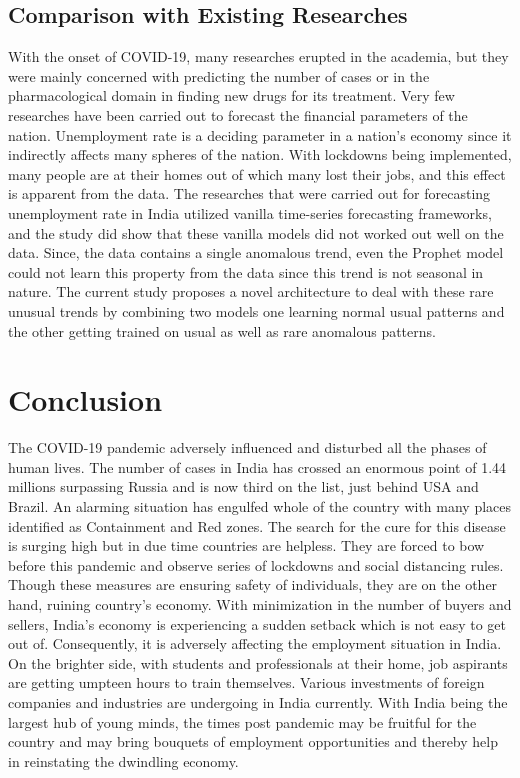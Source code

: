 \documentclass[times,twocolumn,final,authoryear]{elsarticle}
\begin{document}
	\subsection{Comparison with Existing Researches}
	With the onset of COVID-19, many researches erupted in the academia, but they were mainly concerned with predicting the number of cases or in the pharmacological domain in finding new drugs for its treatment. Very few researches have been carried out to forecast the financial parameters of the nation. Unemployment rate is a deciding parameter in a nation's economy since it indirectly affects many spheres of the nation. With lockdowns being implemented, many people are at their homes out of which many lost their jobs, and this effect is apparent from the data. The researches that were carried out for forecasting unemployment rate in India utilized vanilla time-series forecasting frameworks, and the study did show that these vanilla models did not worked out well on the data. Since, the data contains a single anomalous trend, even the Prophet model could not learn this property from the data since this trend is not seasonal in nature. The current study proposes a novel architecture to deal with these rare unusual trends by combining two models one learning normal usual patterns and the other getting trained on usual as well as rare anomalous patterns. 
	
	
	\section{Conclusion}\label{Sec_Final}
	The COVID-19 pandemic adversely influenced and disturbed all the phases of human lives. The number of cases in India has crossed an enormous point of 1.44 millions surpassing Russia and is now third on the list, just behind USA and Brazil. An alarming situation has engulfed whole of the country with many places identified as Containment and Red zones. The search for the cure for this disease is surging high but in due time countries are helpless. They are forced to bow before this pandemic and observe series of lockdowns and social distancing rules. Though these measures are ensuring safety of individuals, they are on the other hand, ruining country's economy. With minimization in the number of buyers and sellers, India's economy is experiencing a sudden setback which is not easy to get out of. Consequently, it is adversely affecting the employment situation in India. On the brighter side, with students and professionals at their home, job aspirants are getting umpteen hours to train themselves. Various investments of foreign companies and industries are undergoing in India currently. With India being the largest hub of young minds, the times post pandemic may be fruitful for the country and may bring bouquets of employment opportunities and thereby help in reinstating the dwindling economy. 
	
\end{document}
